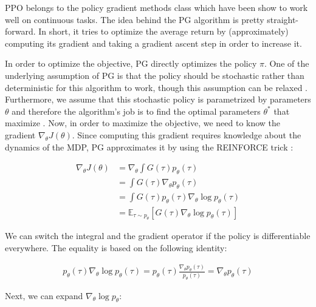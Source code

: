 \ac{PPO} belongs to the policy gradient methods class which have been show to work well on continuous tasks. The idea behind the \ac{PG} algorithm is pretty straight-forward. In short, it tries to optimize the average return by (approximately) computing its gradient and taking a gradient ascent step in order to increase it.

In order to optimize the objective, \ac{PG} directly optimizes the policy $\pi$. One of the underlying assumption of \ac{PG} is that the policy should be stochastic rather than deterministic for this algorithm to work, though this assumption can be relaxed \cite{ddpg}. Furthermore, we assume that this stochastic policy is parametrized by parameters $\theta$ and therefore the algorithm's job is to find the optimal parameters $\theta^*$ that maximize . Now, in order to maximize the objective, we need to know the gradient $\nabla_\theta J(\theta)$. Since computing this gradient requires knowledge about the dynamics of the \ac{MDP}, \ac{PG} approximates it by using the REINFORCE trick \cite{williams1992simple}:

\begin{align}
    \nabla_\theta J(\theta) &= \nabla_\theta \int G(\tau) p_\theta(\tau) \\
    &= \int G(\tau) \nabla_\theta p_\theta(\tau)\\
    &= \int G(\tau) p_\theta(\tau) \nabla_\theta \log p_\theta(\tau)\\
    &= \mathbb{E}_{\tau \sim p_\theta} \left[ G(\tau) \nabla_\theta \log p_\theta(\tau) \right]
    \label{eq:obj_grad}
\end{align}

We can switch the integral and the gradient operator if the policy is differentiable everywhere. The equality is based on the following identity:

\begin{align*}
    p_\theta(\tau)\nabla_\theta \log p_\theta(\tau) = p_\theta(\tau) \frac{\nabla_\theta p_\theta(\tau)}{p_\theta(\tau)} = \nabla_\theta p_\theta(\tau)
\end{align*}

Next, we can expand $\nabla_\theta \log p_\theta$:


